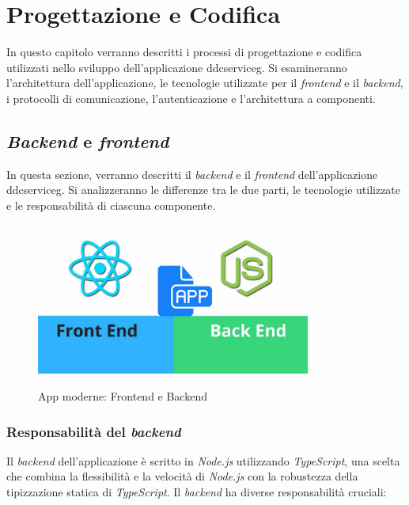 \chapter{Progettazione e Codifica}
\label{chap:design_coding}

In questo capitolo verranno descritti i processi di progettazione e codifica utilizzati nello sviluppo dell'applicazione \gls{ddcserviceg}\glox.
Si esamineranno l'architettura dell'applicazione, le tecnologie utilizzate per il \textit{frontend} e il \textit{backend}, i protocolli di comunicazione, l'autenticazione e l'architettura a componenti.

\section{\textit{Backend} e \textit{frontend}}
\label{subsec:backend_frontend}

In questa sezione, verranno descritti il \textit{backend} e il \textit{frontend} dell'applicazione \gls{ddcserviceg}\glox.
Si analizzeranno le differenze tra le due parti, le tecnologie utilizzate e le responsabilità di ciascuna componente.

\begin{figure}[H]
    \centering
    \includegraphics[alt={Rappresentazione grafica delle tecnologie per backend e frontend}, height=5cm]{img/frontendbackend.png}
    \caption{App moderne: Frontend e Backend}
    \label{fig:backendfrontend}
\end{figure}

\subsection{Responsabilità del \textit{backend}}
Il \textit{backend} dell'applicazione è scritto in \textit{Node.js} utilizzando \textit{TypeScript}, una scelta che combina la flessibilità e la velocità di \textit{Node.js} con la robustezza della tipizzazione statica di \textit{TypeScript}.
Il \textit{backend} ha diverse responsabilità cruciali:


